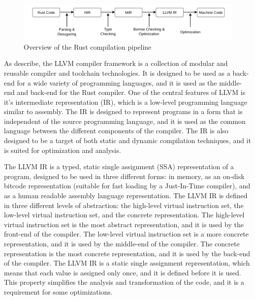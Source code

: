 \begin{figure}[ht]
    \centering
    \includegraphics[width=1\textwidth]{figuras/rustc.png}
    \caption{Overview of the Rust compilation pipeline}
    \label{fig:rustc-pipeline}
\end{figure}


\label{sec:consideracoes_preliminares}

As \citet{lattner2004llvm} describe, the LLVM  compiler framework is a collection of modular and reusable compiler
and toolchain technologies. It is designed to be used as a back-end for a wide variety of programming languages,
and it is used as the middle-end and back-end for the Rust compiler. One of the central features of LLVM is it's intermediate
representation (IR), which is a low-level programming language similar to assembly. The IR is designed to represent
programs in a form that is independent of the source programming language, and it is used as the common language between
the different components of the compiler. The IR is also designed to be a target of both static and dynamic compilation
techniques, and it is suited for optimization and analysis.

The LLVM IR is a typed, static single assignment (SSA)  representation of a program, designed to be used in three
different forms: in memory, as an on-disk bitcode representation (suitable for fast loading by a Just-In-Time compiler),
and as a human readable assembly language representation. The LLVM IR is defined in three different levels of abstraction:
the high-level virtual instruction set, the low-level virtual instruction set, and the concrete representation. The high-level
virtual instruction set is the most abstract representation, and it is used by the front-end of the compiler. The low-level
virtual instruction set is a more concrete representation, and it is used by the middle-end of the compiler. The concrete
representation is the most concrete representation, and it is used by the back-end of the compiler. The LLVM IR is a
static single assignment representation, which means that each value is assigned only once, and it is defined before it is used.
This property simplifies the analysis and transformation of the code, and it is a requirement for some optimizations.

